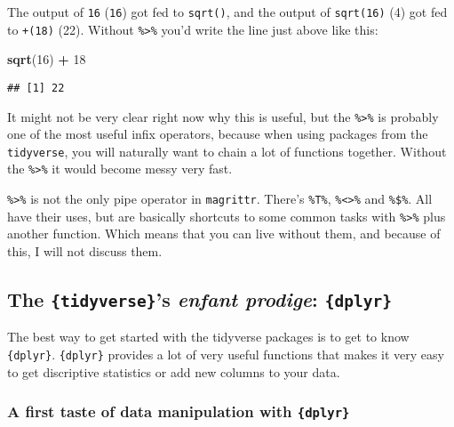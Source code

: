 \documentclass[
]{article}
\newenvironment{Shaded}{\begin{snugshade}}{\end{snugshade}}
\newcommand{\DecValTok}[1]{\textcolor[rgb]{0.00,0.00,0.81}{#1}}
\newcommand{\KeywordTok}[1]{\textcolor[rgb]{0.13,0.29,0.53}{\textbf{#1}}}
\newcommand{\NormalTok}[1]{#1}
\newcommand{\OperatorTok}[1]{\textcolor[rgb]{0.81,0.36,0.00}{\textbf{#1}}}
\newcommand{\StringTok}[1]{\textcolor[rgb]{0.31,0.60,0.02}{#1}}
\begin{document}
The output of \texttt{16} (\texttt{16}) got fed to \texttt{sqrt()}, and the output of \texttt{sqrt(16)} (4) got fed to \texttt{+(18)}
(22). Without \texttt{\%\textgreater{}\%} you'd write the line just above like this:

\begin{Shaded}
\begin{Highlighting}[]
\KeywordTok{sqrt}\NormalTok{(}\DecValTok{16}\NormalTok{) }\OperatorTok{+}\StringTok{ }\DecValTok{18}
\end{Highlighting}
\end{Shaded}

\begin{verbatim}
## [1] 22
\end{verbatim}

It might not be very clear right now why this is useful, but the \texttt{\%\textgreater{}\%} is probably one of the
most useful infix operators, because when using packages from the \texttt{tidyverse}, you will
naturally want to chain a lot of functions together. Without the \texttt{\%\textgreater{}\%} it would become messy very fast.

\texttt{\%\textgreater{}\%} is not the only pipe operator in \texttt{magrittr}. There's \texttt{\%T\%}, \texttt{\%\textless{}\textgreater{}\%} and \texttt{\%\$\%}. All have their
uses, but are basically shortcuts to some common tasks with \texttt{\%\textgreater{}\%} plus another function. Which
means that you can live without them, and because of this, I will not discuss them.

\hypertarget{the-tidyverses-enfant-prodige-dplyr}{%
\subsection{\texorpdfstring{The \texttt{\{tidyverse\}}'s \emph{enfant prodige}: \texttt{\{dplyr\}}}{The \{tidyverse\}'s enfant prodige: \{dplyr\}}}\label{the-tidyverses-enfant-prodige-dplyr}}

The best way to get started with the tidyverse packages is to get to know \texttt{\{dplyr\}}. \texttt{\{dplyr\}} provides
a lot of very useful functions that makes it very easy to get discriptive statistics or add new columns
to your data.

\hypertarget{a-first-taste-of-data-manipulation-with-dplyr}{%
\subsubsection{\texorpdfstring{A first taste of data manipulation with \texttt{\{dplyr\}}}{A first taste of data manipulation with \{dplyr\}}}\label{a-first-taste-of-data-manipulation-with-dplyr}}
\end{document}
